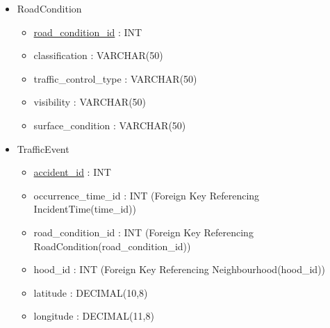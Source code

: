 \documentclass[12pt, a4paper]{article}
\begin{document}
\begin{itemize}
    \item RoadCondition
    \begin{itemize}
        \item \underline{road\_condition\_id} : INT
        \item classification : VARCHAR(50)
        \item traffic\_control\_type : VARCHAR(50)
        \item visibility : VARCHAR(50)
        \item surface\_condition : VARCHAR(50)
    \end{itemize}
    \item TrafficEvent
    \begin{itemize}
        \item \underline{accident\_id} : INT
        \item occurrence\_time\_id : INT (Foreign Key Referencing IncidentTime(time\_id))
        \item road\_condition\_id : INT (Foreign Key Referencing RoadCondition(road\_condition\_id))
        \item hood\_id : INT (Foreign Key Referencing Neighbourhood(hood\_id))
        \item latitude : DECIMAL(10,8)
        \item longitude : DECIMAL(11,8)
    \end{itemize}
\end{itemize}
\end{document}
